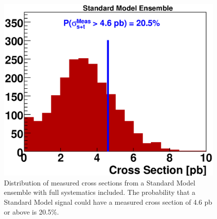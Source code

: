 \begin{figure}[!h!tbp]
\begin{center}
\includegraphics[width=1.0\textwidth]
{eps/Limits/prob_sm.eps}
\caption{Distribution of measured cross sections from a Standard Model
ensemble with full systematics included. The probability that a Standard Model signal could have a measured cross section of 4.6 pb or above is 20.5$\%$.}
\label{probsm}
\end{center}
\end{figure}

